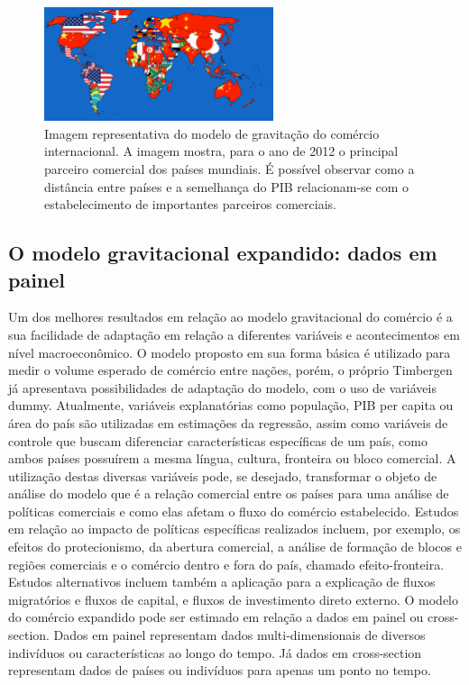 \documentclass[12pt]{article}
\begin{document}
\begin{figure}[h]
\centering
\includegraphics[width=0.6\textwidth]{mapa_importsdesenho.png}
\caption{\label{fig:imports}Imagem representativa do modelo de gravitação do comércio internacional. A imagem mostra, para o ano de 2012 o principal parceiro comercial dos países mundiais. É possível observar como a distância entre países e a semelhança do PIB relacionam-se com o estabelecimento de importantes parceiros comerciais.}
\end{figure}

\subsection{O modelo gravitacional expandido: dados em painel}
Um dos melhores resultados em relação ao modelo gravitacional do comércio é a sua facilidade de adaptação em relação a diferentes variáveis e acontecimentos em nível macroeconômico.  O modelo proposto em sua forma básica é utilizado para medir o volume esperado de comércio entre nações, porém, o próprio Timbergen já apresentava possibilidades de adaptação do modelo, com o uso de variáveis dummy.  \linebreak Atualmente, variáveis explanatórias como população, PIB per capita ou área do país são utilizadas em estimações da regressão, assim como variáveis de controle que buscam diferenciar características específicas de um país, como ambos países possuírem a mesma língua, cultura, fronteira ou bloco comercial. A utilização destas diversas variáveis pode, se desejado, transformar o objeto de análise do modelo que é a relação comercial entre os países para uma análise de políticas comerciais e como elas afetam o fluxo do comércio estabelecido. \linebreak Estudos em relação ao impacto de políticas específicas realizados incluem, por exemplo, os efeitos do protecionismo, da abertura comercial, a análise de formação de blocos e regiões comerciais e o comércio dentro e fora do país, chamado efeito-fronteira. Estudos alternativos incluem também a aplicação para a explicação de fluxos migratórios e fluxos de capital, e fluxos de investimento direto externo. \linebreak O modelo do comércio expandido pode ser estimado em relação a dados em painel ou cross-section. Dados em painel representam dados multi-dimensionais de diversos indivíduos ou características ao longo do tempo. Já dados em cross-section representam dados de países ou indivíduos para apenas um ponto no tempo. 
\end{document}
